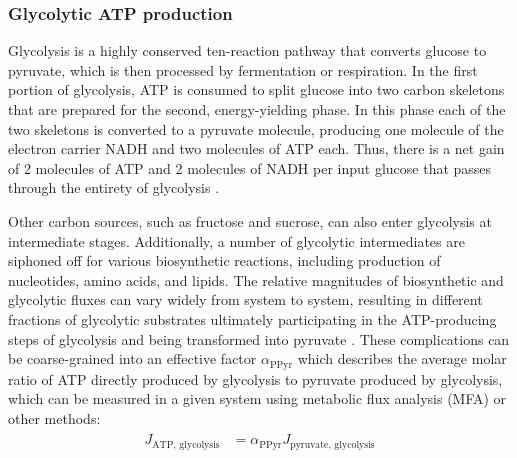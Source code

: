 \documentclass{compactarticle}
\begin{document}
\subsubsection{Glycolytic ATP production}

Glycolysis is a highly conserved ten-reaction pathway that converts glucose to pyruvate, which is then processed by fermentation or respiration. In the first portion of glycolysis, ATP is consumed to split glucose into two carbon skeletons that are prepared for the second, energy-yielding phase. In this phase each of the two skeletons is converted to a pyruvate molecule, producing one molecule of the electron carrier NADH and two molecules of ATP each. Thus, there is a net gain of 2 molecules of ATP and 2 molecules of NADH per input glucose that passes through the entirety of glycolysis \cite{alberts_2008}.

Other carbon sources, such as fructose and sucrose, can also enter glycolysis at intermediate stages. Additionally, a number of glycolytic intermediates are siphoned off for various biosynthetic reactions, including production of nucleotides, amino acids, and lipids. The relative magnitudes of biosynthetic and glycolytic fluxes can vary widely from system to system, resulting in different fractions of glycolytic substrates ultimately participating in the ATP-producing steps of glycolysis and being transformed into pyruvate \cite{frick2005characterization,mitsuishi2012nrf2}. These complications can be coarse-grained into an effective factor $ \alpha_\text{PPyr} $ which describes the average molar ratio of ATP directly produced by glycolysis to pyruvate produced by glycolysis, which can be measured in a given system using metabolic flux analysis (MFA) or other methods:
\begin{align}
    \begin{split}
        J_\text{ATP, glycolysis} &= \alpha_\text{PPyr} J_\text{pyruvate, glycolysis}
    \end{split}
    \label{eq:JatpJpyruvate}
\end{align}
\end{document}
